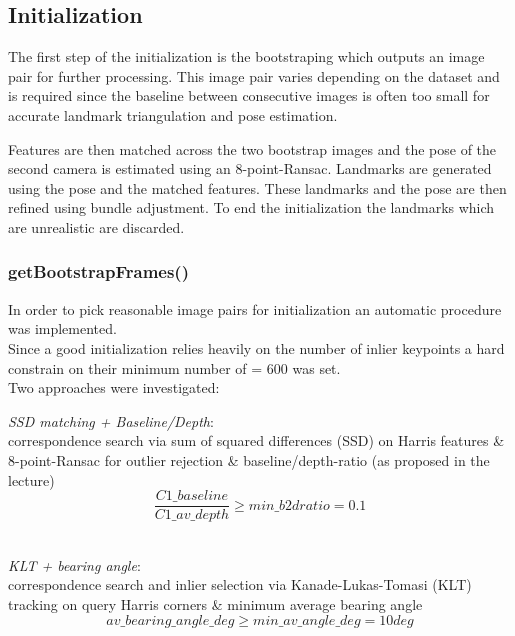 \subsection{Initialization}
\label{sec_init}

The first step of the initialization is the bootstraping which outputs an image pair for further processing. This image pair varies depending on the dataset and is required since the baseline between consecutive images is often too small for accurate landmark triangulation and pose estimation.

Features are then matched across the two bootstrap images and the pose of the second camera is estimated using an 8-point-Ransac.
Landmarks are generated using the pose and the matched features. These landmarks and the pose are then refined using bundle adjustment. To end the initialization the landmarks which are unrealistic are discarded.

\subsubsection{getBootstrapFrames()}
\label{sec_boot}
In order to pick reasonable image pairs for initialization an automatic procedure was implemented.\\
Since a good initialization relies heavily on the number of inlier keypoints a hard constrain on their minimum number of  = $600$ was set.\\

Two approaches were investigated:
\begin{compactitem}
	\item \textit{SSD matching + Baseline/Depth}:\\
	correspondence search via sum of squared differences (SSD) on Harris features \& 8-point-Ransac for outlier rejection \& baseline/depth-ratio (as proposed in the lecture)\\
	\begin{equation}
		\frac{C1\_baseline}{C1\_av\_depth} \geqslant min\_b2dratio = 0.1
	\end{equation}\\
	
	\item \textit{KLT + bearing angle}:\\
	correspondence search and inlier selection via Kanade-Lukas-Tomasi (KLT) tracking on query Harris corners \& minimum average bearing angle\\
	\begin{equation}
		av\_bearing\_angle\_deg \geqslant min\_av\_angle\_deg = 10 deg
	\end{equation}
\end{compactitem}

